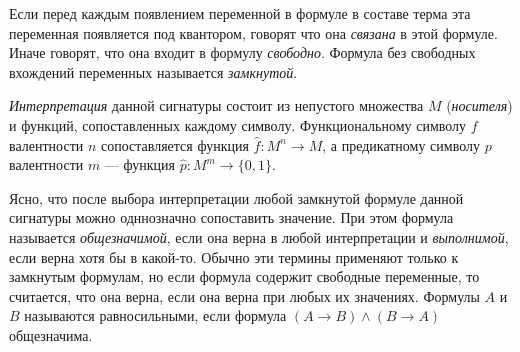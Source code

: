 \documentclass{article}
\begin{document}
Если перед каждым появлением переменной в формуле в составе терма эта переменная появляется под квантором, говорят что она \textit{связана} в этой формуле. Иначе говорят, что она входит в формулу \textit{свободно}. Формула без свободных вхождений переменных называется \textit{замкнутой}.
\begin{definition}
	\textit{Интерпретация} данной сигнатуры состоит из непустого множества $M$ (\textit{носителя}) и функций, сопоставленных каждому символу. Функциональному символу $f$ валентности $n$ сопоставляется функция $\hat{f}:M^n \to M$, а предикатному символу $p$ валентности $m$ --- функция $\hat{p}:M^m \to \{0, 1\}$.

Ясно, что после выбора интерпретации любой замкнутой формуле данной сигнатуры можно одннозначно сопоставить значение. При этом формула называется \textit{общезначимой}, если она верна в любой интерпретации и \textit{выполнимой}, если верна хотя бы в какой-то. Обычно эти термины применяют только к замкнутым формулам, но если формула содержит свободные переменные, то считается, что она верна, если она верна при любых их значениях. Формулы $A$ и $B$ называются равносильными, если формула $(A \to B) \land (B \to A)$ общезначима.
\end{definition}
\end{document}
